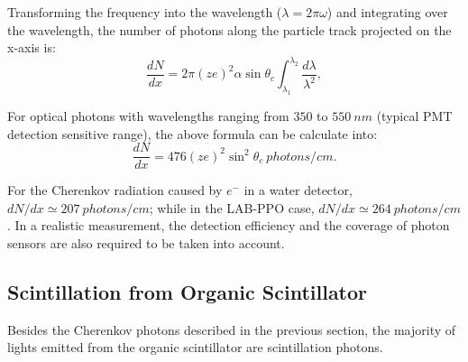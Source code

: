 Transforming the frequency into the wavelength ($\lambda=2\pi\omega$) and integrating over the wavelength, the number of photons along the particle track projected on the x-axis is\cite{leo2012techniques}:
\[
\frac{dN}{dx}=2\pi (ze)^2\alpha\sin\theta_c\int_{\lambda_1}^{\lambda_2}\frac{d\lambda}{\lambda^2},
\]

For optical photons with wavelengths ranging from $350$ to $550~nm$ (typical PMT detection sensitive range), the above formula can be calculate into\cite{leo2012techniques}:
\[
\frac{dN}{dx}=476(ze)^2\sin^2\theta_c~photons/cm.
\]

For the Cherenkov radiation caused by $e^-$ in a water detector, $dN/dx \simeq 207~photons/cm$; while in the LAB-PPO case, $dN/dx \simeq 264~photons/cm$. In a realistic measurement, the detection efficiency and the coverage of photon sensors are also required to be taken into account.

\subsection{Scintillation from Organic Scintillator}

Besides the Cherenkov photons described in the previous section, the majority of lights emitted from the organic scintillator are scintillation photons.


